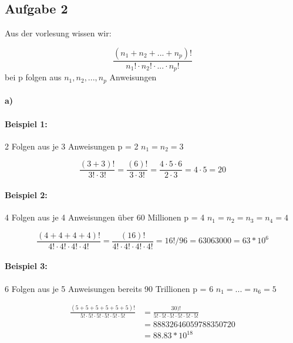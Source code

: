 \subsection*{Aufgabe 2}

Aus der vorlesung wissen wir:

\begin{equation*}
  \frac{(n_{1} + n_{2} + ... + n_{p} )!}
  {n_{1}! \cdot n_{2}! \cdot ... \cdot n_{p}! }
\end{equation*}
bei p folgen aus $n_{1} , n_{2} , ... , n_{p} $ Anweisungen

\paragraph{a)}
\paragraph{Beispiel 1:} 2 Folgen aus je 3 Anweisungen
p = 2
$ n_{1} = n_{2} = 3$

\begin{equation*}
  \frac{(3 + 3)!}
  {3! \cdot 3! }
  =
  \frac{(6)!}
  {3 \cdot 3!}
  = 
  \frac{4 \cdot 5 \cdot 6}
  {2 \cdot 3}
  = 4 \cdot 5
  = 20
\end{equation*}


\paragraph{Beispiel 2:} 4 Folgen aus je 4 Anweisungen über 60 Millionen
p = 4
$ n_{1} = n_{2} = n_{3} = n_{4} = 4$

\begin{equation*}
  \frac{(4 + 4 + 4 + 4)!}
  {4! \cdot 4! \cdot 4! \cdot 4! }
  =
 \frac{(16)!}
  {4! \cdot 4! \cdot 4! \cdot 4! }
  = 16 ! / 96
  = 63063000
  = 63 * 10^{6}
\end{equation*}


\paragraph{Beispiel 3:} 6 Folgen aus je 5 Anweisungen bereits 90 Trillionen
p = 6
$ n_{1} = ...= n_{6} = 5$

\begin{align*}
  \frac{(5 + 5 + 5 + 5 + 5 +5)!}
  {5! \cdot 5! \cdot 5! \cdot 5! \cdot 5! \cdot 5!}
  &=\frac{30)!}
  {5! \cdot 5! \cdot 5! \cdot 5! \cdot 5! \cdot 5!}\\
  &= 88832646059788350720\\
  &= 88.83 * 10^{18}
\end{align*}


